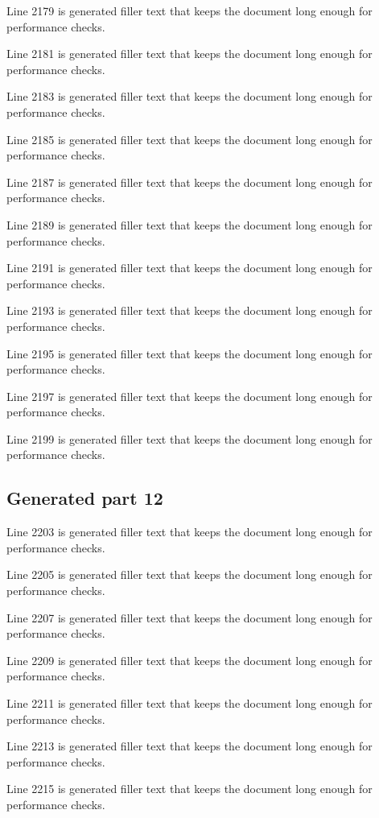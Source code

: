 Line 2179 is generated filler text that keeps the document long enough for performance checks.

Line 2181 is generated filler text that keeps the document long enough for performance checks.

Line 2183 is generated filler text that keeps the document long enough for performance checks.

Line 2185 is generated filler text that keeps the document long enough for performance checks.

Line 2187 is generated filler text that keeps the document long enough for performance checks.

Line 2189 is generated filler text that keeps the document long enough for performance checks.

Line 2191 is generated filler text that keeps the document long enough for performance checks.

Line 2193 is generated filler text that keeps the document long enough for performance checks.

Line 2195 is generated filler text that keeps the document long enough for performance checks.

Line 2197 is generated filler text that keeps the document long enough for performance checks.

Line 2199 is generated filler text that keeps the document long enough for performance checks.

\subsection{Generated part 12}

Line 2203 is generated filler text that keeps the document long enough for performance checks.

Line 2205 is generated filler text that keeps the document long enough for performance checks.

Line 2207 is generated filler text that keeps the document long enough for performance checks.

Line 2209 is generated filler text that keeps the document long enough for performance checks.

Line 2211 is generated filler text that keeps the document long enough for performance checks.

Line 2213 is generated filler text that keeps the document long enough for performance checks.

Line 2215 is generated filler text that keeps the document long enough for performance checks.

